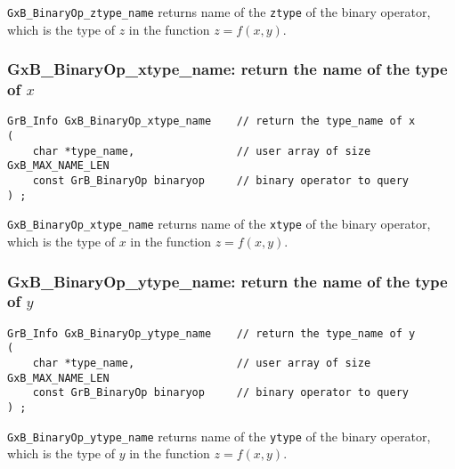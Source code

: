 \documentclass[12pt]{article}
\begin{document}
{\verb'GxB_BinaryOp_ztype_name'
returns name of the \verb'ztype' of the binary operator, which is the
type of $z$ in the function $z=f(x,y)$.

\subsubsection{{\sf GxB\_BinaryOp\_xtype\_name:} return the name of the type of $x$}
\label{binaryop_xtype_name}

\begin{mdframed}[userdefinedwidth=6in]
{\footnotesize
\begin{verbatim}
GrB_Info GxB_BinaryOp_xtype_name    // return the type_name of x
(
    char *type_name,                // user array of size GxB_MAX_NAME_LEN
    const GrB_BinaryOp binaryop     // binary operator to query
) ;
\end{verbatim}
}\end{mdframed}

\verb'GxB_BinaryOp_xtype_name'
returns name of the \verb'xtype' of the binary operator, which is the
type of $x$ in the function $z=f(x,y)$.

\subsubsection{{\sf GxB\_BinaryOp\_ytype\_name:} return the name of the type of $y$}
\label{binaryop_ytype_name}

\begin{mdframed}[userdefinedwidth=6in]
{\footnotesize
\begin{verbatim}
GrB_Info GxB_BinaryOp_ytype_name    // return the type_name of y
(
    char *type_name,                // user array of size GxB_MAX_NAME_LEN
    const GrB_BinaryOp binaryop     // binary operator to query
) ;
\end{verbatim}
} \end{mdframed}

\verb'GxB_BinaryOp_ytype_name'
returns name of the \verb'ytype' of the binary operator, which is the
type of $y$ in the function $z=f(x,y)$.

}
\end{document}
